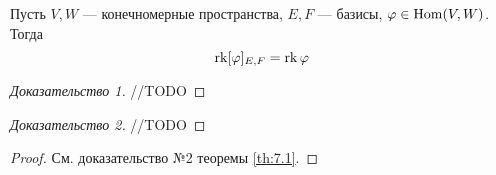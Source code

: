 \documentclass[../main.tex]{subfiles}
\begin{document}
\begin{theorem-non}
  Пусть $V, W$ --- конечномерные пространства, $E, F$ --- базисы, $\varphi \in \operatorname{Hom}(V, W)$. Тогда
  \begin{equation*}
    \operatorname{rk} [\varphi]_{E, F} = \operatorname{rk} \varphi
  \end{equation*}
\end{theorem-non}
\begin{proof}[Доказательство 1]
  //TODO
\end{proof}
\begin{proof}[Доказательство 2]
  //TODO
\end{proof}
\begin{proof}
  См. доказательство №2 теоремы \ref{th:7.1}.
\end{proof}
\end{document}
